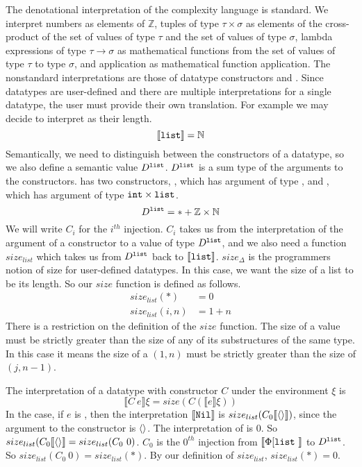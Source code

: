 The denotational interpretation of the complexity language is standard. We
interpret numbers as elements of $\mathbb{Z}$, tuples of type $\tau \times
\sigma$ as elements of the cross-product of the set of values of type $\tau$
and the set of values of type $\sigma$, lambda expressions of type $\tau \to
\sigma$ as mathematical functions from the set of values of type $\tau$ to type
$\sigma$, and application as mathematical function application. The nonstandard
interpretations are those of datatype constructors and . Since datatypes
are user-defined and there are multiple interpretations for a single datatype,
the user must provide their own translation. For example we may decide to interpret
 as their length.
%
\[
  \llbracket \texttt{list} \rrbracket = \mathbb{N}
\]
%
Semantically, we need to distinguish between the constructors of a datatype, so
we also define a semantic value $D^{\texttt{list}}$. $D^{\texttt{list}}$ is a sum type of the
arguments to the  constructors.  has two constructors, ,
which has argument of type , and , which has argument of type
$\texttt{int} \times \texttt{list}$.
%
\[
  D^{\texttt{list}} = \ast + \mathbb{Z} \times \mathbb{N}
\]
%
We will write $C_i$ for the $i^{th}$ injection. $C_i$ takes us from the
interpretation of the argument of a constructor to a value of type
$D^{\texttt{list}}$, and we also need a function $size_{list}$ which takes us from
$D^{\texttt{list}}$ back to $\llbracket \texttt{list} \rrbracket$. $size_\Delta$ is the
programmers notion of size for user-defined datatypes. In this case, we want
the size of a list to be its length. So our $size$ function is defined as follows.
%
\begin{align*}
  size_{list} (\ast) &= 0 \\
  size_{list}(i,n) &= 1 + n
\end{align*}
%
There is a restriction on the definition of the $size$ function. The size of a
value must be strictly greater than the size of any of its substructures of the
same type. In this case it means the size of a $(1, n)$ must be strictly
greater than the size of $(j, n-1)$.

The interpretation of a datatype with constructor $C$ under the environment
$\xi$ is
%
\[
  \llbracket C\ e\rrbracket \xi = size(C (\llbracket e \rrbracket \xi))
\]
%
In the  case, if $e$ is , then the interpretation $\llbracket \texttt{Nil}
\rrbracket$ is $size_{list}(C_0 \llbracket\langle\rangle\rrbracket)$, since the argument to the 
constructor is $\langle\rangle$. The interpretation of  is $0$. So
$size_{list}(C_0 \llbracket\langle\rangle\rrbracket = size_{list}(C_0\ 0)$. $C_0$ is the $0^{th}$
injection from $\llbracket \Phi[\texttt{list}\ \rrbracket$ to $D^{\texttt{list}}$.  So
$size_{list}(C_0\ 0) = size_{list}(\ast)$. By our definition of
$size_{list}$, $size_{list}(\ast) = 0$.



